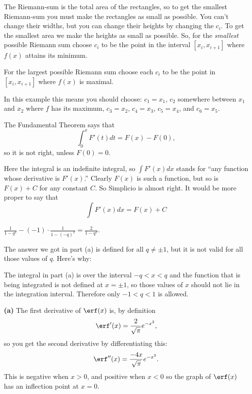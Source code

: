 \item[{\bfseries(VII5.4)}]
The Riemann-sum is the total area of the rectangles, so to get the
smallest Riemann-sum you must make the rectangles as small as
possible.  You can't change their widths, but you can change their
heights by changing the $c_i$.  To get the smallest area we make the
heights as small as possible. So, for the \emph{smallest} possible
Riemann sum choose  $c_i$ to be the point in the interval $[x_i,
x_{i+1}]$ where $f(x)$ attains its minimum.

For the largest possible Riemann sum choose each $c_i$ to be the point
in $[x_i, x_{i+1}]$ where $f(x)$ is maximal.

In this example this means you should choose:  $c_1 = x_1$, $c_2$ somewhere
between $x_1$ and $x_2$ where $f$ has its maximum, $c_3=x_2$, $c_4=x_3$,
$c_5=x_4$, and $c_6 = x_5$.

\bigskip

\item[{\bfseries(VII10.1a)}]
The Fundamental Theorem says that
\[
   \int_0^x F'(t) dt = F(x) - F(0),
\]
so it is not right, unless $F(0)=0$.
\bigskip

\item[{\bfseries(VII10.1b)}]
Here the integral is an indefinite integral, so $\int F'(x)dx$ stands for ``any
function whose derivative is $F'(x)$.''  Clearly $F(x)$ is such a function, but
so is $F(x) + C$ for any constant $C$.
So Simplicio is almost right.  It would be more proper to say that
\[
  \int F'(x) dx = F(x) + C
\]
\bigskip

\item[{\bfseries(VII10.7a)}]
$\frac{1} {1-q^2} - (-1)\cdot \frac{1} {1-(-q)^2} = \frac{2} {1-q^2}$.
\bigskip

\item[{\bfseries(VII10.7b)}]
The answer we got in part (a) is defined for all $q\neq \pm1$, but it
is not valid for all those values of $q$.  Here's why:

The integral in part (a) is over the interval $-q<x<q$ and the
function that is being integrated is not defined at $x=\pm1$, so those
values of $x$ should not lie in the integration interval.  Therefore
only $-1<q<1$ is allowed.
\bigskip

\item[{\bfseries(VII10.9b)}]
\textbf{(a)} The first derivative of $\erf(x)$ is, by definition
\[
\erf'(x) = \frac2{\sqrt{\pi}}e^{-x^2},
\]
so you get the second derivative by differentiating this:
\[
\erf''(x) = \frac{-4x}{\sqrt{\pi}} e^{-x^2}.
\]
This is negative when $x>0$, and positive when $x<0$ so the graph of
$\erf(x)$ has an inflection point at $x=0$.

